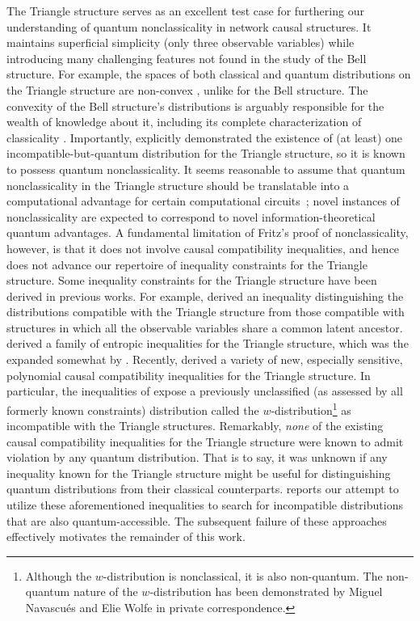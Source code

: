 \documentclass[aps, 10pt, english, twoside, pra, nofootinbib, tightenlines, longbibliography, superscriptaddress]{revtex4-1}
\begin{document}
    The Triangle structure serves as an excellent test case for furthering our understanding of quantum nonclassicality in network causal structures. It maintains superficial simplicity (only three observable variables) while introducing many challenging features not found in the study of the Bell structure.
    For example, the spaces of both classical and quantum distributions on the Triangle structure are non-convex \cite{Fritz_2012,Inflation}, unlike for the Bell structure. The convexity of the Bell structure's distributions is arguably responsible for the wealth of knowledge about it, including its complete characterization of classicality \cite{Brunner_2013}.
    Importantly, \citet{Fritz_2012} explicitly demonstrated the existence of (at least) one incompatible-but-quantum distribution for the Triangle structure, so it is known to possess quantum nonclassicality. It seems reasonable to assume that quantum nonclassicality in the Triangle structure should be translatable into a computational advantage for certain computational circuits~\cite{Terhal_2002}; novel instances of nonclassicality are expected to correspond to novel information-theoretical quantum advantages. A fundamental limitation of Fritz's proof of nonclassicality, however, is that it does not involve causal compatibility inequalities, and hence does not advance our repertoire of inequality constraints for the Triangle structure.
    Some inequality constraints for the Triangle structure have been derived in previous works. For example, \citet{Steudel_2010} derived an inequality distinguishing the distributions compatible with the Triangle structure from those compatible with structures in which all the observable variables share a common latent ancestor. \citet{Henson_2014} derived a family of entropic inequalities for the Triangle structure, which was the expanded somewhat by \citet{Weilenmann_2016}. Recently, \citet{Inflation} derived a variety of new, especially sensitive, polynomial causal compatibility inequalities for the Triangle structure. In particular, the inequalities of \cite{Inflation} expose a previously unclassified (as assessed by all formerly known constraints) distribution called the $w$-distribution\footnote{Although the $w$-distribution is nonclassical, it is also non-quantum. The non-quantum nature of the $w$-distribution has been demonstrated by Miguel Navascués and Elie Wolfe in private correspondence.} as incompatible with the Triangle structures.
    Remarkably, \emph{none} of the existing causal compatibility inequalities for the Triangle structure were known to admit violation by any quantum distribution. That is to say, it was unknown if any inequality known for the Triangle structure might be useful for distinguishing quantum distributions from their classical counterparts.  reports our attempt to utilize these aforementioned inequalities to search for incompatible distributions that are also quantum-accessible. The subsequent failure of these approaches effectively motivates the remainder of this work.
\end{document}
